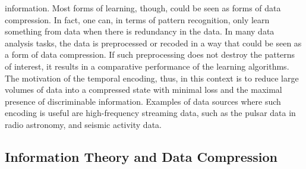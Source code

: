 information. Most forms of learning, though, could be seen as forms of data compression. In fact, one can, in terms of pattern recognition, only learn something from data when there is redundancy in the data. In many data analysis tasks, the data is preprocessed or recoded in a way that could be seen as a form of data compression. If such preprocessing does not destroy the patterns of interest, it results in a comparative performance of the learning algorithms. The motivation of the temporal encoding, thus, in this context is to reduce large volumes of data into a compressed state with minimal loss and the maximal presence of discriminable information. Examples of data sources where such encoding is useful are high-frequency streaming data, such as the pulsar data in radio astronomy, and seismic activity data. 

\subsection{Information Theory and Data Compression}

